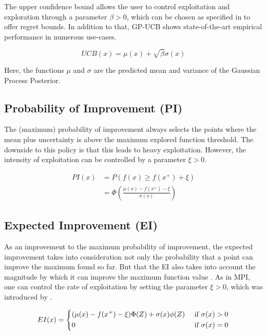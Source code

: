 The upper confidence bound allows the user to control exploitation and exploration through a parameter $\beta > 0$, which can be chosen as specified in \citep{UCBRegretProof} to offer regret bounds.
In addition to that, GP-UCB shows state-of-the-art empirical performance in numerous use-cases\citep{Djolonga2013}.

\begin{equation}
UCB(x) = \mu(x) + \sqrt{ \beta } \sigma(x)
\end{equation}

Here, the functions $\mu$ and $\sigma$ are the predicted mean and variance of the Gaussian Process Posterior.

\subsection{Probability of Improvement (PI)}
The (maximum) probability of improvement \citep{AcquisitionFunctions} always selects the points where the mean plus uncertainty is above the maximum explored function threshold. 
The downside to this policy is that this leads to heavy exploitation.
However, the intensity of exploitation can be controlled by a parameter $\xi > 0$.

\begin{align}
    PI(x) & = P( f(x) \geq f(x^+) + \xi ) \\
    & = \Phi ( \frac{\mu(x) - f(x^+) - \xi}{\sigma(x)}  ) 
\end{align}


\subsection{Expected Improvement (EI)}
As an improvement to the maximum probability of improvement, the expected improvement takes into consideration not only the probability that a point can improve the maximum found so far.
But that the EI also takes into account the magnitude by which it can improve the maximum function value \citep{AcquisitionFunctions}.
As in MPI, one can control the rate of exploitation by setting the parameter $\xi > 0$, which was introduced by \citep{Lizotte2008}.

\begin{align}
    EI(x) =
    \begin{dcases}
        ( \mu (x) - f(x^+) - \xi) \Phi(Z) + \sigma (x) \phi (Z) & \text{ if } \sigma (x) > 0 \\
        0 & \text{ if } \sigma (x) = 0
    \end{dcases} \\
\end{align}

